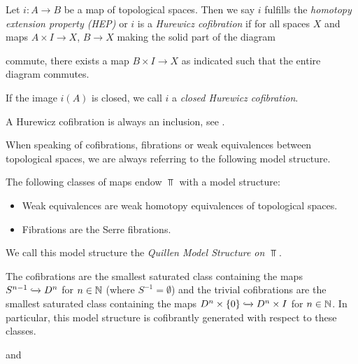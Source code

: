 \begin{definition} %
    Let $i\colon A\to B$ be a map of topological spaces.
    Then we say $i$ fulfills the \emph{homotopy extension property (HEP)} or $i$ is a \emph{Hurewicz cofibration} if for all spaces $X$ and maps $A\times I\to X$, $B\to X$ making the solid part of the diagram 
    \begin{center}
    \end{center}
    commute, there exists a map $B\times I\to X$ as indicated such that the entire diagram commutes.
    
    If the image $i(A)$ is closed, we call $i$ a \emph{closed Hurewicz cofibration}.
\end{definition}
\begin{remark}\label{rmk:hurewiczCofibIsIncl}
    A Hurewicz cofibration is always an inclusion, see \cite[Proposition 4H.1]{hatcher2002algebraic}.
\end{remark}
When speaking of cofibrations, fibrations or weak equivalences between topological spaces, we are always referring to the following model structure.
\begin{thm}
    The following classes of maps endow $\Top$ with a model structure:
    \begin{itemize}
        \item Weak equivalences are weak homotopy equivalences of topological spaces.
        \item Fibrations are the Serre fibrations.
    \end{itemize}
    We call this model structure the \emph{Quillen Model Structure on $\Top$}.
    
    The cofibrations are the smallest saturated class containing the maps $S^{n-1}\xhookrightarrow{}D^n$ for $n\in\mathbb{N}$ (where $S^{-1}=\emptyset$) and the trivial cofibrations are the smallest saturated class containing the maps $D^n\times\left\lbrace0\right\rbrace\xhookrightarrow{}D^n\times I$ for $n\in\mathbb{N}$.
    In particular, this model structure is cofibrantly generated with respect to these classes.
    \begin{reference}
        \cite[Chap. II, \S 3, Theorem 1]{Quillen1967} and \cite{hirschhorn_quillen}
    \end{reference}
\end{thm}
